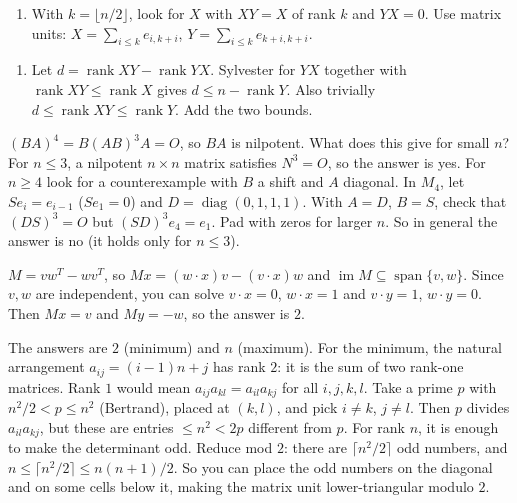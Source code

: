 \documentclass[11pt,a4paper]{article}
\begin{document}
\begin{enumerate}
\def\labelenumi{(\alph{enumi})}
\tightlist
\item
  With \(k=\lfloor n/2\rfloor\), look for \(X\) with \(XY=X\) of rank \(k\) and \(YX=0\). Use matrix units: \(X=\sum_{i\le k}e_{i,k+i}\), \(Y=\sum_{i\le k}e_{k+i,k+i}\).
\end{enumerate}
\begin{enumerate}
\def\labelenumi{(\alph{enumi})}
\setcounter{enumi}{1}
\tightlist
\item
  Let \(d=\operatorname{rank}XY-\operatorname{rank}YX\). Sylvester for \(YX\) together with \(\operatorname{rank}XY\le\operatorname{rank}X\) gives \(d\le n-\operatorname{rank}Y\). Also trivially \(d\le\operatorname{rank}XY\le\operatorname{rank}Y\). Add the two bounds.
\end{enumerate}

\((BA)^4=B(AB)^3A=O\), so \(BA\) is nilpotent. What does this give for small \(n\)?
For \(n\le3\), a nilpotent \(n\times n\) matrix satisfies \(N^3=O\), so the answer is yes. For \(n\ge4\) look for a counterexample with \(B\) a shift and \(A\) diagonal.
In \(M_4\), let \(Se_i=e_{i-1}\) (\(Se_1=0\)) and \(D=\operatorname{diag}(0,1,1,1)\). With \(A=D\), \(B=S\), check that \((DS)^3=O\) but \((SD)^3e_4=e_1\). Pad with zeros for larger \(n\). So in general the answer is no (it holds only for \(n\le3\)).

\(M=vw^T-wv^T\), so \(Mx=(w\cdot x)v-(v\cdot x)w\) and \(\operatorname{im}M\subseteq\operatorname{span}\{v,w\}\).
Since \(v,w\) are independent, you can solve \(v\cdot x=0\), \(w\cdot x=1\) and \(v\cdot y=1\), \(w\cdot y=0\). Then \(Mx=v\) and \(My=-w\), so the answer is \(2\).

The answers are \(2\) (minimum) and \(n\) (maximum). For the minimum, the natural arrangement \(a_{ij}=(i-1)n+j\) has rank \(2\): it is the sum of two rank-one matrices.
Rank \(1\) would mean \(a_{ij}a_{kl}=a_{il}a_{kj}\) for all \(i,j,k,l\). Take a prime \(p\) with \(n^2/2\lt p\le n^2\) (Bertrand), placed at \((k,l)\), and pick \(i\ne k\), \(j\ne l\). Then \(p\) divides \(a_{il}a_{kj}\), but these are entries \(\le n^2\lt 2p\) different from \(p\).
For rank \(n\), it is enough to make the determinant odd. Reduce mod \(2\): there are \(\lceil n^2/2\rceil\) odd numbers, and \(n\le\lceil n^2/2\rceil\le n(n+1)/2\). So you can place the odd numbers on the diagonal and on some cells below it, making the matrix unit lower-triangular modulo \(2\).
\end{document}
